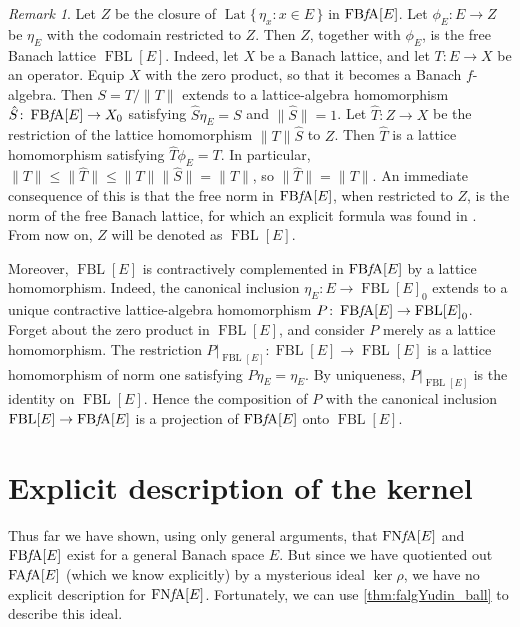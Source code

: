 \documentclass{memo-l}
\theoremstyle{definition}
\theoremstyle{remark}
\newtheorem{rem}[theorem]{Remark}
\numberwithin{section}{chapter}
\numberwithin{equation}{chapter}
\newcommand{\falg}{$f\!$-algebra}
\newcommand{\FAFAv}[1]{\operatorname{FA{\it f}\!A}[#1]}
\newcommand{\FNFA}[1]{\operatorname{FN{\it f}\!A}[#1]}
\newcommand{\FBFA}[1]{\operatorname{FB{\it f}\!A}[#1]}
\newcommand{\FBL}[1]{\operatorname{FBL}[#1]}
\DeclareMathOperator{\Lat}{Lat}
\begin{document}
\begin{rem}\label{rem:FBLinFBFA}
    Let $Z$ be the closure of $\Lat \{\, \eta _x : x \in E \, \} $ in
    $\FBFA E$. Let $\phi _E\colon E\to Z$ be $\eta
    _E$ with the codomain restricted to $Z$. Then $Z$, together with
    $\phi _E$, is the free Banach lattice $\FBL E$. Indeed, let $X$ be a Banach
    lattice, and let $T\colon E\to X$ be an operator. Equip $X$ with
    the zero product, so that it becomes a Banach \falg. Then $S=T/\|T\|$
    extends to a lattice-algebra homomorphism $\hat{S}\colon \FBFA
    E\to X_0$ satisfying $\hat{S} \eta _E=S$ and $\|\hat{S}\|=1$. Let
    $\hat T\colon Z\to X$ be
    the restriction of the lattice homomorphism $\|T\| \hat{S}$ to
    $Z$. Then $\hat T$ is a lattice homomorphism
    satisfying $\hat T \phi _E=T$. In particular, $\|T\|\le \|\hat T\|\le
    \|T\|\|\hat{S}\|=\|T\|$, so $\|\hat T\|=\|T\|$. An immediate
    consequence of this is that the
    free norm in $\FBFA E$, when restricted to $Z$, is the norm of the free
    Banach lattice, for which an explicit formula was found in
    \cite{aviles_rodriguez_tradacete2018}. From now on, $Z$ will be
    denoted as $\FBL E$.

    Moreover, $\FBL E$ is contractively complemented in $\FBFA E$ by a
    lattice homomorphism. Indeed, the
    canonical inclusion $\eta_E \colon E\to {\FBL E}_0$ extends to a
    unique contractive lattice-algebra homomorphism $P\colon \FBFA
    E\to {\FBL E}_0$. Forget about the zero product in $\FBL E$, and
    consider $P$ merely as a lattice homomorphism. The restriction
    $P|_{\FBL E}\colon \FBL E\to \FBL E$ is a lattice homomorphism of
    norm one satisfying $P \eta _E=\eta _E$. By uniqueness, $P|_{\FBL
    E}$ is the identity on $\FBL E$. Hence the composition of $P$ with
    the canonical inclusion $\FBL E\to \FBFA E$ is a projection of
    $\FBFA E$ onto $\FBL E$.
\end{rem}

\section{Explicit description of the
kernel}\label{sec:explicit_description}

Thus far we have shown, using only general arguments, that $\FNFA E$
and $\FBFA E$ exist for a general Banach space $E$. But since we have
quotiented out $\FAFAv E$ (which we know explicitly) by a mysterious
ideal $\ker \rho $, we have no explicit description for $\FNFA E$.
Fortunately, we can use \cref{thm:falgYudin_ball} to describe this
ideal.
\end{document}
